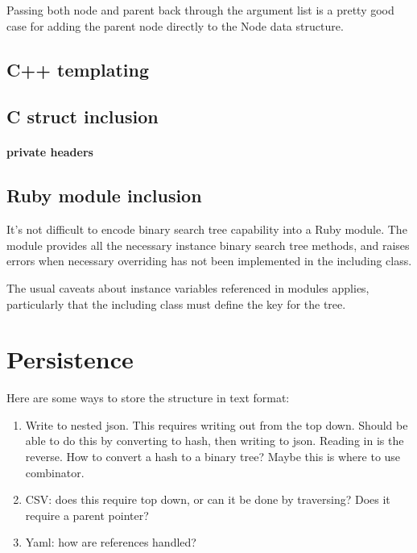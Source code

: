 \documentclass{article}
\begin{document}
Passing both node and parent back through the argument list is a pretty good
case for adding the parent node directly to the Node data structure.


\subsection{C++ templating}

\subsection{C struct inclusion}

\paragraph{private headers}

\subsection{Ruby module inclusion}

It's not difficult to encode binary search tree capability into a Ruby module.
The module provides all the necessary instance binary search tree methods, and
raises errors when necessary overriding has not been implemented in the
including class.

The usual caveats about instance variables referenced in modules applies,
particularly that the including class must define the key for the tree.

\section{Persistence}

Here are some ways to store the structure in text format:

\begin{enumerate}
\item Write to nested json. This requires writing out from the top
down. Should be able to do this by converting to hash, then
writing to json. Reading in is the reverse. How to convert a
hash to a binary tree? Maybe this is where to use combinator.

\item CSV: does this require top down, or can it be done by traversing?
Does it require a parent pointer?

\item Yaml: how are references handled?
\end{enumerate}
\end{document}
